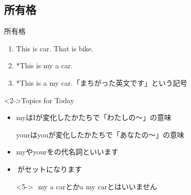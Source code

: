 \documentclass[aspectratio=169,xcolor={dvipsnames,table}]{beamer}
\begin{document}
\subsection{所有格}
\begin{frame}[plain]{所有格}
 \begin{enumerate}
  \item<1-> This is  car. That is  bike.
  \item<4-> *This is my a car.
  \item<4-> *This is a my car.\hfill{\scriptsize * 「まちがった英文です」という記号}
 \end{enumerate}

\begin{block}<2->{Topics for Today}


\begin{itemize}[circle]
 \item myはIが変化したかたちで「わたしの～」の意味

yourはyouが変化したかたちで「あなたの～」の意味
 \item<2-> myやyourをの代名詞といいます
 \item<3-> \,がセットになります
 \item[]<5-> \mbox{}\hfill\dbend\,\,my a carとかa my carとはいいません\hspace{.5\zw}\mbox{}\\
\mbox{}
\end{itemize}
     \end{block}
\end{frame}
\end{document}
